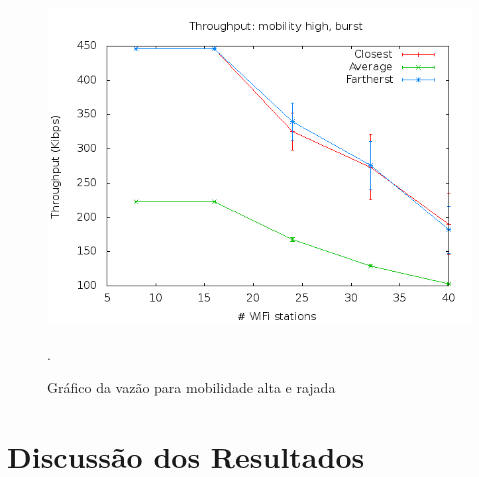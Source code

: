 \documentclass[12pt,twoside,a4paper]{article}
\begin{document}
\begin{figure}[H]
\centering
\includegraphics[scale=0.5]{mo818-throughput-mob-2-traf-1}
\caption{Gráfico da vazão para mobilidade alta e rajada}.
\label{fig:vazao-m2-t1}
\end{figure}

\section{Discussão dos Resultados}
\label{sec:02}
\end{document}

